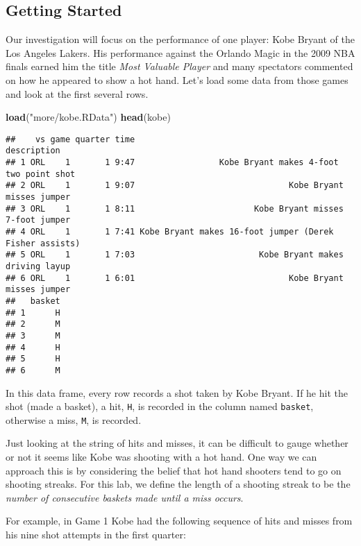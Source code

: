\documentclass[
]{article}
\newenvironment{Shaded}{\begin{snugshade}}{\end{snugshade}}
\newcommand{\KeywordTok}[1]{\textcolor[rgb]{0.13,0.29,0.53}{\textbf{#1}}}
\newcommand{\NormalTok}[1]{#1}
\newcommand{\StringTok}[1]{\textcolor[rgb]{0.31,0.60,0.02}{#1}}
\begin{document}
\hypertarget{getting-started}{%
\subsection{Getting Started}\label{getting-started}}

Our investigation will focus on the performance of one player: Kobe
Bryant of the Los Angeles Lakers. His performance against the Orlando
Magic in the 2009 NBA finals earned him the title \emph{Most Valuable
Player} and many spectators commented on how he appeared to show a hot
hand. Let's load some data from those games and look at the first
several rows.

\begin{Shaded}
\begin{Highlighting}[]
\KeywordTok{load}\NormalTok{(}\StringTok{"more/kobe.RData"}\NormalTok{)}
\KeywordTok{head}\NormalTok{(kobe)}
\end{Highlighting}
\end{Shaded}

\begin{verbatim}
##    vs game quarter time                                             description
## 1 ORL    1       1 9:47                 Kobe Bryant makes 4-foot two point shot
## 2 ORL    1       1 9:07                               Kobe Bryant misses jumper
## 3 ORL    1       1 8:11                        Kobe Bryant misses 7-foot jumper
## 4 ORL    1       1 7:41 Kobe Bryant makes 16-foot jumper (Derek Fisher assists)
## 5 ORL    1       1 7:03                         Kobe Bryant makes driving layup
## 6 ORL    1       1 6:01                               Kobe Bryant misses jumper
##   basket
## 1      H
## 2      M
## 3      M
## 4      H
## 5      H
## 6      M
\end{verbatim}

In this data frame, every row records a shot taken by Kobe Bryant. If he
hit the shot (made a basket), a hit, \texttt{H}, is recorded in the
column named \texttt{basket}, otherwise a miss, \texttt{M}, is recorded.

Just looking at the string of hits and misses, it can be difficult to
gauge whether or not it seems like Kobe was shooting with a hot hand.
One way we can approach this is by considering the belief that hot hand
shooters tend to go on shooting streaks. For this lab, we define the
length of a shooting streak to be the \emph{number of consecutive
baskets made until a miss occurs}.

For example, in Game 1 Kobe had the following sequence of hits and
misses from his nine shot attempts in the first quarter:
\end{document}
